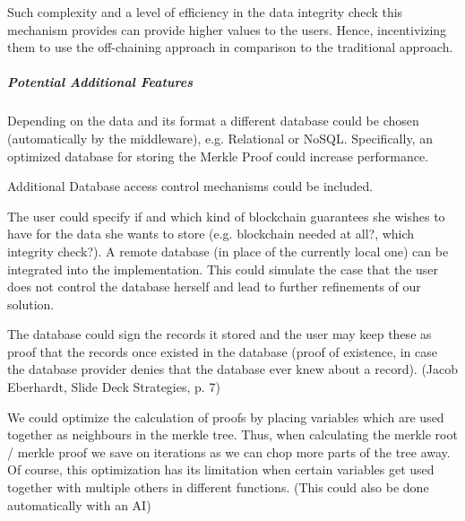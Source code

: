 Such complexity and a level of efficiency in the data integrity check this mechanism provides can provide higher values to the users. Hence, incentivizing them to use the off-chaining approach in comparison to the traditional approach.

\subparagraph{Potential Additional Features}
Depending on the data and its format a different database could be chosen (automatically by the middleware), e.g. Relational or NoSQL. Specifically, an optimized database for storing the Merkle Proof could increase performance.

Additional Database access control mechanisms could be included.

The user could specify if and which kind of blockchain guarantees she wishes to have for the data she wants to store (e.g. blockchain needed at all?, which integrity check?).
A remote database (in place of the currently local one) can be integrated into the implementation. This could simulate the case that the user does not control the database herself and lead to further refinements of our solution.

The database could sign the records it stored and the user may keep these as proof that the records once existed in the database (proof of existence, in case the database provider denies that the database ever knew about a record). (Jacob Eberhardt, Slide Deck Strategies, p. 7)

We could optimize the calculation of proofs by placing variables which are used together as neighbours in the merkle tree. Thus, when calculating the merkle root / merkle proof we save on iterations as we can chop more parts of the tree away. Of course, this optimization has its limitation when certain variables get used together with multiple others in different functions. (This could also be done automatically with an AI)


\newpage
